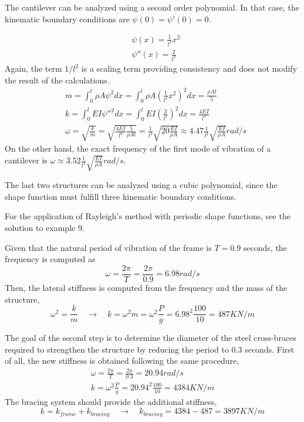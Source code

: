 \documentclass{problems}
\begin{document}
\parbox{.7\textwidth}{The cantilever can be analyzed using a second order polynomial. In that case, the kinematic boundary conditions are $\psi(0) = \psi'(0) = 0$.} \hspace{1em}
\parbox{.25\textwidth}{}
\begin{align*}
&\psi(x) = \frac{1}{l^2} x^2 \\
&\psi''(x) = \frac{2}{l^2}
\end{align*}
Again, the term $1/l^2$ is a scaling term providing consistency and does not modify the result of the calculations.
\begin{align*}
&m = \int_0^l \rho A\psi^2dx = \int_0^l \rho A \left(\frac{1}{l^2} x^2\right)^2dx = \frac{\rho Al}{5} \\
&k = \int_0^l EI \psi''^2 dx = \int_0^l EI \left(\frac{2}{l^2}\right)^2dx = \frac{4EI}{l^3} \\
&\omega = \sqrt{\frac{k}{m}} = \sqrt{\frac{4EI}{l^3}\frac{5}{\rho Al}} = \frac{1}{l^2}\sqrt{20\frac{EI}{\rho A}} \approx 4.47\frac{1}{l^2}\sqrt{\frac{EI}{\rho A}} rad/s
\end{align*}
On the other hand, the exact frequency of the first mode of vibration of a cantilever is $\omega\approx3.52\frac{1}{l^2}\sqrt{\frac{EI}{\rho A}}rad/s$.

The last two structures can be analyzed using a cubic polynomial, since the shape function must fulfill three kinematic boundary conditions.

For the application of Rayleigh's method with periodic shape functions, see the solution to example 9.



Given that the natural period of vibration of the frame is $T=0.9$ seconds, the frequency is computed as
$$
\omega = \frac{2\pi}{T} = \frac{2\pi}{0.9} = 6.98rad/s
$$
Then, the lateral stiffness is computed from the frequency and the mass of the structure,
$$
\omega^2 = \frac{k}{m} \quad \rightarrow \quad
k = \omega^2m = \omega^2\frac{P}{g} = 6.98^2\frac{100}{10} = 487KN/m
$$

The goal of the second step is to determine the diameter of the steel cross-braces required to strengthen the structure by reducing the period to 0.3 seconds. First of all, the new stiffness is obtained following the same procedure,
\begin{align*}
\omega = \frac{2\pi}{T} = \frac{2\pi}{0.3} = 20.94rad/s \\
k = \omega^2\frac{P}{g} = 20.94^2\frac{100}{10} = 4384KN/m
\end{align*}
The bracing system should provide the additional stiffness,
$$
k = k_{frame} + k_{bracing} \quad \rightarrow \quad k_{bracing} = 4384 - 487 = 3897KN/m
$$
\end{document}
